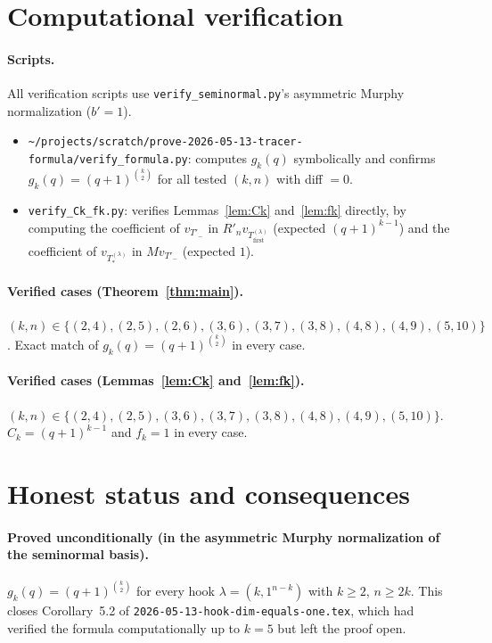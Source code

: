\documentclass[11pt]{article}
\theoremstyle{definition}
\begin{document}
\section{Computational verification}\label{sec:verify}

\paragraph{Scripts.}  All verification scripts use \texttt{verify\_seminormal.py}'s
asymmetric Murphy normalization ($b' = 1$).

\begin{itemize}[leftmargin=2em,topsep=0.2em,itemsep=0.1em]
\item \texttt{\textasciitilde/projects/scratch/prove-2026-05-13-tracer-formula/verify\_formula.py}:
   computes $g_k(q)$ symbolically and confirms
   $g_k(q) = (q+1)^{\binom{k}{2}}$ for all tested $(k, n)$ with diff $= 0$.
\item \texttt{verify\_Ck\_fk.py}: verifies Lemmas~\ref{lem:Ck}
   and~\ref{lem:fk} directly, by computing the coefficient of $v_{T'_-}$
   in $R'_n v_{T_{\mathrm{first}}^{(\lambda)}}$ (expected
   $(q+1)^{k-1}$) and the coefficient of $v_{T_{*}^{(\lambda)}}$ in
   $M v_{T'_-}$ (expected $1$).
\end{itemize}

\paragraph{Verified cases (Theorem~\ref{thm:main}).}
$(k, n) \in \{(2, 4), (2, 5), (2, 6), (3, 6), (3, 7), (3, 8), (4, 8),
(4, 9), (5, 10)\}$.  Exact match of $g_k(q) = (q+1)^{\binom{k}{2}}$
in every case.

\paragraph{Verified cases (Lemmas~\ref{lem:Ck} and~\ref{lem:fk}).}
$(k, n) \in \{(2, 4), (2, 5), (3, 6), (3, 7), (3, 8), (4, 8), (4, 9),
(5, 10)\}$.  $C_k = (q+1)^{k-1}$ and $f_k = 1$ in every case.

\section{Honest status and consequences}\label{sec:status}

\paragraph{Proved unconditionally (in the asymmetric Murphy normalization
of the seminormal basis).}  $g_k(q) = (q+1)^{\binom{k}{2}}$ for every
hook $\lambda = (k, 1^{n-k})$ with $k \ge 2$, $n \ge 2k$.  This closes
Corollary~5.2 of \texttt{2026-05-13-hook-dim-equals-one.tex}, which had
verified the formula computationally up to $k = 5$ but left the proof
open.
\end{document}
